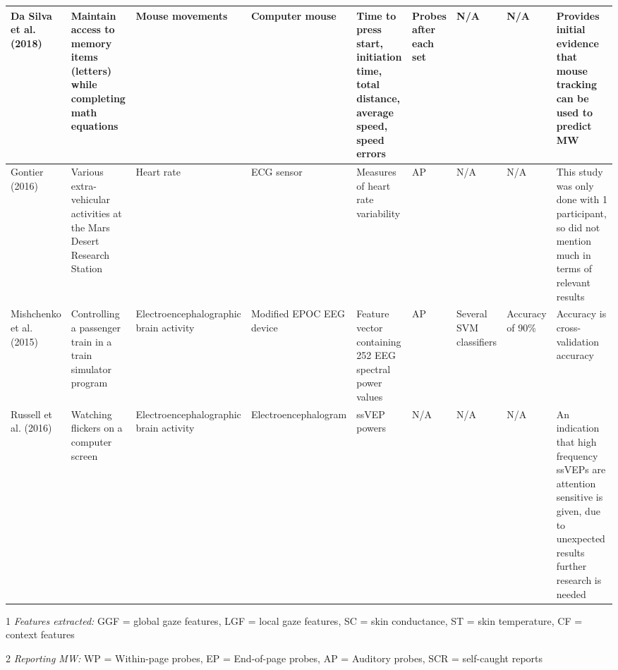 \begin{ThreePartTable}
\begin{xtabular}{P{20mm}P{24mm}P{22mm}P{24mm}P{28mm}P{21mm}P{26mm}P{24mm}P{42mm}}
                Da Silva et al. (2018) \cite{DaSilva2018WanderingWandering} & Maintain access to memory items (letters) while completing math equations & Mouse movements & Computer mouse & Time to press start, initiation time, total distance, average speed, speed errors & Probes after each set & N/A & N/A & Provides initial evidence that mouse tracking can be used to predict MW\\ \midrule
                Gontier (2016) \cite{Gontier2016HowEnvironment} & Various extra-vehicular activities at the Mars Desert Research Station & Heart rate & ECG sensor & Measures of heart rate variability & AP & N/A & N/A & This study was only done with 1 participant, so did not mention much in terms of relevant results \\ \midrule
                Mishchenko et al. (2015) \cite{Mishchenko2015DetectingTespiti} & Controlling a passenger train in a train simulator program & Electroence\-phalo\-graphic brain activity & Modified EPOC EEG device & Feature vector containing 252 EEG spectral power values & AP & Several SVM classifiers & Accuracy of 90\% & Accuracy is cross-validation accuracy \\ \midrule
                Russell et al. (2016) \cite{Russell2016MonitoringEnvironments} & Watching flickers on a computer screen & Electroence\-phalo\-graphic brain activity & Electroence\-phalo\-gram & ssVEP powers & N/A & N/A & N/A & An indication that high frequency ssVEPs are attention sensitive is given, due to unexpected results further research is needed\\ \midrule
                \bottomrule
        \end{xtabular}
        \begin{tablenotes}
                \small
                \item[1] \emph{Features extracted:} GGF = global gaze features, LGF = local gaze features, SC = skin conductance, ST = skin temperature, CF = context features
                \item[2] \emph{Reporting MW:} WP = Within-page probes, EP = End-of-page probes, AP = Auditory probes, SCR = self-caught reports
        \end{tablenotes}
\end{ThreePartTable}
\restoregeometry %
\twocolumn       %